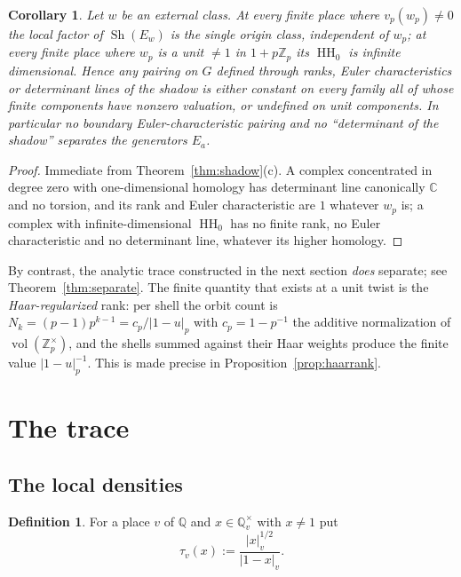 \documentclass[11pt]{amsart}
\newtheorem{corollary}[theorem]{Corollary}
\theoremstyle{definition}
\newtheorem{definition}[theorem]{Definition}
\theoremstyle{remark}
\newcommand{\C}{\mathbb C}
\newcommand{\Z}{\mathbb Z}
\newcommand{\Q}{\mathbb Q}
\newcommand{\vol}{\operatorname{vol}}
\newcommand{\HH}{\operatorname{HH}}
\newcommand{\Sh}{\operatorname{Sh}}
\begin{document}
\begin{corollary}\label{cor:blind}
Let $w$ be an external class.  At every finite place where $v_p(w_p)\ne0$ the
local factor of $\Sh(E_w)$ is the single origin class, independent of $w_p$;
at every finite place where $w_p$ is a unit $\ne1$ in $1+p\Z_p$ its
$\HH_0$ is infinite dimensional.  Hence any pairing on $G$ defined through ranks, Euler characteristics
or determinant lines of the shadow is either \emph{constant} on every family
all of whose finite components have nonzero valuation, or \emph{undefined} on
unit components.  In particular no boundary Euler-characteristic pairing and
no ``determinant of the shadow'' separates the generators $E_a$.
\end{corollary}

\begin{proof}
Immediate from Theorem~\ref{thm:shadow}(c).  A complex concentrated in degree
zero with one-dimensional homology has determinant line canonically $\C$ and
no torsion, and its rank and Euler characteristic are $1$ whatever $w_p$ is; a
complex with infinite-dimensional $\HH_0$ has no finite rank, no Euler
characteristic and no determinant line, whatever its higher homology.
\end{proof}

By contrast, the analytic trace constructed in the next section \emph{does}
separate; see Theorem~\ref{thm:separate}.  The finite quantity that exists at a
unit twist is the \emph{Haar-regularized} rank: per shell the orbit count is
$N_k=(p-1)p^{k-1}=c_p/|1-u|_p$ with $c_p=1-p^{-1}$ the additive normalization
of $\vol(\Z_p^{\times})$, and the shells summed against their Haar weights
produce the finite value $|1-u|_p^{-1}$.  This is made precise in
Proposition~\ref{prop:haarrank}.

\section{The trace}\label{sec:trace}

\subsection{The local densities}

\begin{definition}\label{def:tau}
For a place $v$ of $\Q$ and $x\in\Q_v^{\times}$ with $x\ne1$ put
\begin{equation}\label{eq:tau}
\tau_v(x):=\frac{|x|_v^{1/2}}{|1-x|_v}.
\end{equation}
\end{definition}
\end{document}
